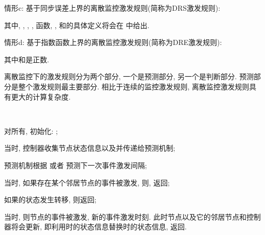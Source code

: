         情形c: 基于同步误差上界的离散监控激发规则(简称为DRS激发规则):
        \begin{comment}\label{drule:1}
            \nonumber \pi^{i}_{k}=&\max\Big\{t:
            \sum^N_{j=1,j\neq i}(-l_{ij}(r_{t+t^i_k}))\varphi(t,\xi^i_k,\zeta^j_{k_j(t+t^i_k)},x_i(t^i_k),x_j(t^i_k))\\
             &\quad+\tau d_i(r_{t+t^i_k})\varphi(t,\xi^i_k,0,x_i(t^i_k),s(t^i_k))
            \leq\omega \psi(t,\xi^i_k,0,x_i(t^i_k),s(t^i_k))\Big\},\\
           \nonumber t_{k+1}^i&=t_{k}^i+\pi^{i}_{k},
            \end{comment}
        其中, , , , 函数, , 和的具体定义将会在 中给出.

        情形d: 基于指数函数上界的离散监控激发规则(简称为DRE激发规则):
        \begin{comment}\label{drule:2}
             \nonumber \pi^{i}_{k}=&\max\Big\{t:
            \sum^N_{j=1,j\neq i}(-l_{ij}(r_{t+t^i_k}))\mathrm{E}\varphi(t,\xi^i_k,\zeta^j_{k_j(t+t^i_k)},x_i(t^i_k),x_j(t^i_k))\\
            &\quad+\tau d_i(r_{t+t^i_k})\mathrm{E}\varphi(t,\xi^i_k,0,x_i(t^i_k),s(t^i_k))
            \leq ae^{-b(t+t^i_k)}\Big\},\\
            \nonumber t_{k+1}^i&=t_{k}^i+\pi^{i}_{k},
            \end{comment}
        其中和是正数.
        \begin{rem}
            离散监控下的激发规则分为两个部分, 一个是预测部分, 另一个是判断部分. 预测部分是整个激发规则最主要部分. 相比于连续的监控激发规则, 离散监控激发规则具有更大的计算复杂度.
        \end{rem}
            \begin{algo}[离散监控事件激发算法]\label{algo2}~~

             对所有, 初始化: ;

             当时, 控制器收集节点状态信息以及并传递给预测机制;

             预测机制根据 或者 预测下一次事件激发间隔;

             当时, 如果存在某个邻居节点的事件被激发, 则, 返回;

             如果的状态发生转移, 则返回;

             当时, 则节点的事件被激发, 新的事件激发时刻. 此时节点以及它的邻居节点和控制器将会更新, 即利用时的状态信息替换时的状态信息, 返回.
             \end{algo}

